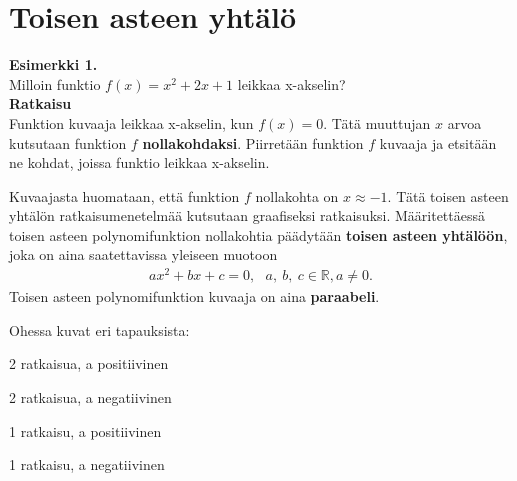 \chapter{Toisen asteen yhtälö}
\textbf{Esimerkki 1.} \\
Milloin funktio $f(x)=x^2+2x+1$ leikkaa x-akselin? \\
\textbf{Ratkaisu} \\
Funktion kuvaaja leikkaa x-akselin, kun $f(x)=0$. Tätä muuttujan $x$ arvoa kutsutaan funktion $f$ \textbf{nollakohdaksi}. Piirretään funktion $f$ kuvaaja ja etsitään ne kohdat, joissa funktio leikkaa x-akselin. %

\begin{kuvaajapohja}{1.5}{-2.5}{0.5}{-0.5}{3}
\end{kuvaajapohja}

Kuvaajasta huomataan, että funktion $f$ nollakohta on $x \approx -1$. Tätä toisen asteen yhtälön ratkaisumenetelmää kutsutaan graafiseksi ratkaisuksi.
Määritettäessä toisen asteen polynomifunktion nollakohtia päädytään \textbf{toisen asteen yhtälöön}, joka on aina saatettavissa yleiseen muotoon
\begin{align*}
ax^2+bx+c=0, \ \ \ a, \ b, \ c  \in \mathbb{R}, a \neq 0.
\end{align*}
Toisen asteen polynomifunktion kuvaaja on aina \textbf{paraabeli}. \\


Ohessa kuvat eri tapauksista:

2 ratkaisua, a positiivinen

\begin{lukusuora}{-1}{1}{4}
\end{lukusuora}

2 ratkaisua, a negatiivinen

\begin{lukusuora}{-1}{1}{4}
\end{lukusuora}

1 ratkaisu, a positiivinen

\begin{lukusuora}{-2}{2}{4}
\end{lukusuora}

1 ratkaisu, a negatiivinen

